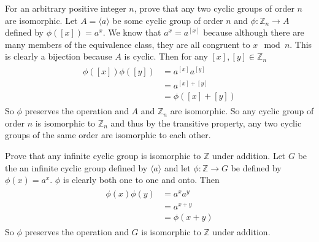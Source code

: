 \documentclass[paper=a4, fontsize=11pt]{jhwhw} %
\begin{document}
For an arbitrary positive integer $n$, prove that any two cyclic groups of order $n$ are isomorphic.
\solution
Let $A = \langle a \rangle$ be some cyclic group of order $n$ and $\phi: \mathbb Z_n \to A$ defined by $\phi([x]) = a^x$. We know that $a^x = a^{[x]}$ because although there are many members of the equivalence class, they are all congruent to $x \mod n$. This is clearly a bijection because $A$ is cyclic. Then for any $[x], [y] \in \mathbb Z_n$
\begin{align}
\begin{split}
\phi([x])\phi([y]) &= a^{[x]}a^{[y]}\\
&= a^{[x]+[y]}\\
&= \phi([x] + [y])
\end{split}
\end{align}
So $\phi$ preserves the operation and $A$ and $\mathbb Z_n$ are isomorphic. So any cyclic group of order $n$ is isomorphic to $\mathbb Z_n$ and thus by the transitive property, any two cyclic groups of the same order are isomorphic to each other.

Prove that any infinite cyclic group is isomorphic to $\mathbb Z$ under addition.
\solution
Let $G$ be the an infinite cyclic group defined by $\langle a \rangle$ and let $\phi: \mathbb Z \to G$ be defined by $\phi(x) = a^x$. $\phi$ is clearly both one to one and onto. Then
\begin{align}
\begin{split}
\phi(x)\phi(y) &= a^xa^y\\
&= a^{x+y}\\
&= \phi(x+y)
\end{split}
\end{align}
So $\phi$ preserves the operation and $G$ is isomorphic to $\mathbb Z$ under addition. 
\end{document}
